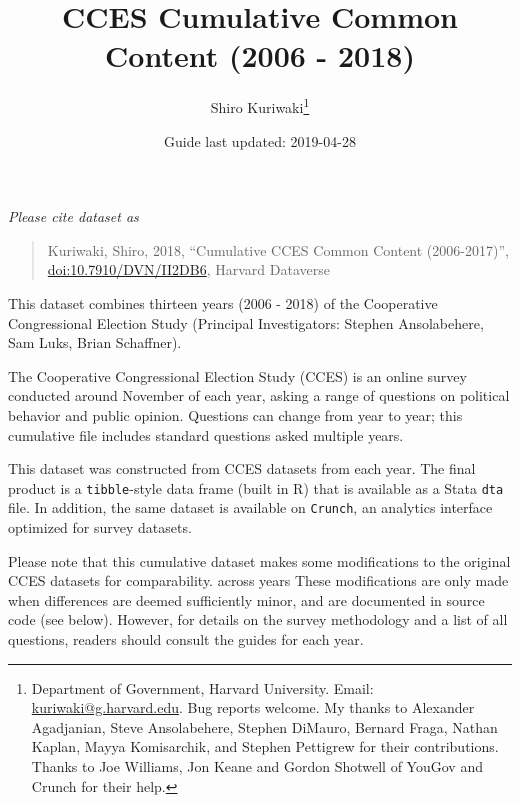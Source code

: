 \documentclass[10pt,article,oneside]{memoir}
\title{ \LARGE\textbf{CCES Cumulative Common Content (2006 - 2018)}}
\author{Shiro Kuriwaki\thanks{Department of Government, Harvard University. Email:
\url{kuriwaki@g.harvard.edu}. Bug reports welcome. My thanks to
Alexander Agadjanian, Steve Ansolabehere, Stephen DiMauro, Bernard
Fraga, Nathan Kaplan, Mayya Komisarchik, and Stephen Pettigrew for their
contributions. Thanks to Joe Williams, Jon Keane and Gordon Shotwell of
YouGov and Crunch for their help.}  }
\date{Guide last updated: 2019-04-28}
\theoremstyle{definition}
\begin{document}
\maketitle





\renewcommand\UrlFont{\color{crimson}\ttfamily}
















\emph{Please cite dataset as}

\begin{quote}
Kuriwaki, Shiro, 2018, ``Cumulative CCES Common Content (2006-2017)'',
\href{https://dataverse.harvard.edu/dataset.xhtml?persistentId=doi:10.7910/DVN/II2DB6}{\url{doi:10.7910/DVN/II2DB6}},
Harvard Dataverse
\end{quote}

\noindent This dataset combines thirteen years (2006 - 2018) of the
Cooperative Congressional Election Study (Principal Investigators:
Stephen Ansolabehere, Sam Luks, Brian Schaffner).

The Cooperative Congressional Election Study (CCES) is an online survey
conducted around November of each year, asking a range of questions on
political behavior and public opinion. Questions can change from year to
year; this cumulative file includes standard questions asked multiple
years.

This dataset was constructed from CCES datasets from each year. The
final product is a \texttt{tibble}-style data frame (built in R) that is
available as a Stata \texttt{dta} file. In addition, the same dataset is
available on \texttt{Crunch}, an analytics interface optimized for
survey datasets.

Please note that this cumulative dataset makes some modifications to the
original CCES datasets for comparability. across years These
modifications are only made when differences are deemed sufficiently
minor, and are documented in source code (see below). However, for
details on the survey methodology and a list of all questions, readers
should consult the guides for each year.

\bigskip
\end{document}
